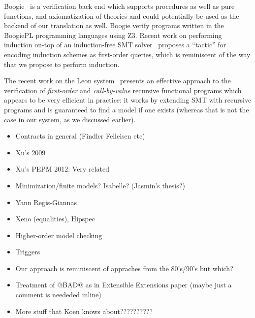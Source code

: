 Boogie~\cite{boogie} is a verification back end which supports procedures as well as 
pure functions, and axiomatization of theories and could potentially be used as the 
backend of our translation as well. Boogie verify programs written in the BoogiePL 
programming languages using Z3. Recent work on performing induction on-top of an 
induction-free SMT solver~\cite{Leino:2012:AIS:2189257.2189278} proposes a ``tactic''
for encoding induction schemes as first-order queries, which is reminiscent of the way
that we propose to perform induction.

The recent work on the Leon system~\cite{Suter:2011:SMR:2041552.2041575} presents
an effective approach to the verification of {\em first-order} and {\em call-by-value} 
recursive functional programs which appears to be very efficient in practice: it works
by extending SMT with recursive programs and is guaranteed to find a model if one 
exists (whereas that is not the case in our system, as we discussed earlier). 

\begin{itemize}
  \item Contracts in general (Findler Felleisen etc)
  \item Xu's 2009
  \item Xu's PEPM 2012: Very related
  \item Minimization/finite models? Isabelle? (Jasmin's thesis?)
  \item Yann Regis-Giannas 
  \item Xeno (equalities), Hipspec 
  \item Higher-order model checking
  \item Triggers
  \item Our approach is reminiscent of appraches from the 80's/90's but which?
  \item Treatment of @BAD@ as in Extensible Extensions paper (maybe just a comment is neededed inline)
  \item More stuff that Koen knows about??????????
\end{itemize}
